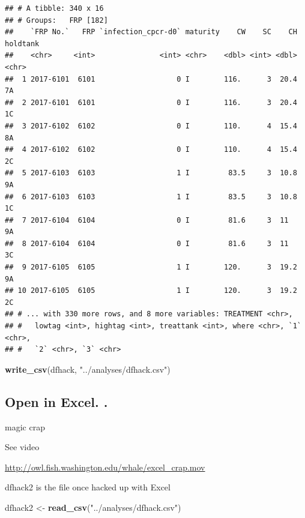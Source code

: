 \documentclass[]{article}
\newenvironment{Shaded}{\begin{snugshade}}{\end{snugshade}}
\newcommand{\KeywordTok}[1]{\textcolor[rgb]{0.13,0.29,0.53}{\textbf{#1}}}
\newcommand{\StringTok}[1]{\textcolor[rgb]{0.31,0.60,0.02}{#1}}
\newcommand{\NormalTok}[1]{#1}
\begin{document}
\begin{verbatim}
## # A tibble: 340 x 16
## # Groups:   FRP [182]
##    `FRP No.`   FRP `infection_cpcr-d0` maturity    CW    SC    CH holdtank
##    <chr>     <int>               <int> <chr>    <dbl> <int> <dbl> <chr>   
##  1 2017-6101  6101                   0 I        116.      3  20.4 7A      
##  2 2017-6101  6101                   0 I        116.      3  20.4 1C      
##  3 2017-6102  6102                   0 I        110.      4  15.4 8A      
##  4 2017-6102  6102                   0 I        110.      4  15.4 2C      
##  5 2017-6103  6103                   1 I         83.5     3  10.8 9A      
##  6 2017-6103  6103                   1 I         83.5     3  10.8 1C      
##  7 2017-6104  6104                   0 I         81.6     3  11   9A      
##  8 2017-6104  6104                   0 I         81.6     3  11   3C      
##  9 2017-6105  6105                   1 I        120.      3  19.2 9A      
## 10 2017-6105  6105                   1 I        120.      3  19.2 2C      
## # ... with 330 more rows, and 8 more variables: TREATMENT <chr>,
## #   lowtag <int>, hightag <int>, treattank <int>, where <chr>, `1` <chr>,
## #   `2` <chr>, `3` <chr>
\end{verbatim}

\begin{Shaded}
\begin{Highlighting}[]
\KeywordTok{write_csv}\NormalTok{(dfhack, }\StringTok{"../analyses/dfhack.csv"}\NormalTok{)}
\end{Highlighting}
\end{Shaded}

\subsection{Open in Excel. .}\label{open-in-excel.-.}

magic crap

See video

\url{http://owl.fish.washington.edu/whale/excel_crap.mov}

dfhack2 is the file once hacked up with Excel

\begin{Shaded}
\begin{Highlighting}[]
\NormalTok{dfhack2 <-}\StringTok{ }\KeywordTok{read_csv}\NormalTok{(}\StringTok{"../analyses/dfhack.csv"}\NormalTok{)}
\end{Highlighting}
\end{Shaded}
\end{document}
